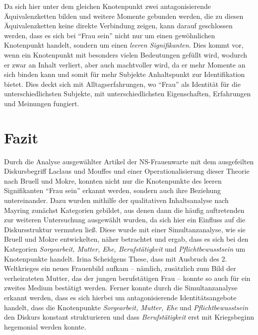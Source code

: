 \documentclass[12pt, titlepage=true, toc=bib]{scrartcl}
\begin{document}
Da sich hier unter dem gleichen Knotenpunkt zwei antagonisierende Äquivalenzketten bilden und weitere Momente gebunden werden, die zu diesen Äquivalenzketten keine direkte Verbindung zeigen, kann darauf geschlossen werden, dass es sich bei "`Frau sein"' nicht nur um einen gewöhnlichen Knotenpunkt handelt, sondern um einen \textit{leeren Signifikanten}. Dies kommt vor, wenn ein Knotenpunkt mit besonders vielen Bedeutungen gefüllt wird, wodurch er zwar an Inhalt verliert, aber auch machtvoller wird, da er mehr Momente an sich binden kann und somit für mehr Subjekte Anhaltspunkt zur Identifikation bietet. Dies deckt sich mit Alltagserfahrungen, wo "`Frau"' als Identität für die unterschiedlichsten Subjekte, mit unterschiedlichsten Eigenschaften, Erfahrungen und Meinungen fungiert.


\section{Fazit}

Durch die Analyse ausgewählter Artikel der NS-Frauenwarte mit dem ausgefeilten Diskursbegriff Laclaus und Mouffes und einer Operationalisierung dieser Theorie nach Bruell und Mokre, konnten nicht nur die Knotenpunkte des leeren Signifikanten "`Frau sein"' erkannt werden, sondern auch ihre Beziehung untereinander. Dazu wurden mithilfe der qualitativen Inhaltsanalyse nach Mayring zunächst Kategorien gebildet, aus denen dann die häufig auftretenden zur weiteren Untersuchung ausgewählt wurden, da sich hier ein Einfluss auf die Diskursstruktur vermuten ließ. Diese wurde mit einer Simultanzanalyse, wie sie Bruell und Mokre entwickelten, näher betrachtet und ergab, dass es sich bei den Kategorien \textit{Sorgearbeit, Mutter, Ehe, Berufstätigkeit} und \textit{Pflichtbewusstsein} um Knotenpunkte handelt. Irina Scheidgens These, dass mit Ausbruch des 2. Weltkrieges ein neues Frauenbild aufkam -- nämlich, zusätzlich zum Bild der verheirateten Mutter, das der jungen berufstätigen Frau -- konnte so auch für ein zweites Medium bestätigt werden. Ferner konnte durch die Simultanzanalyse erkannt werden, dass es sich hierbei um antagonisierende Identitätsangebote handelt, dass die Knotenpunkte \textit{Sorgearbeit, Mutter, Ehe} und \textit{Pflichtbewusstsein} den Diskurs konstant strukturieren und dass \textit{Berufstätigkeit} erst mit Kriegsbeginn hegemonial werden konnte. 
\end{document}
